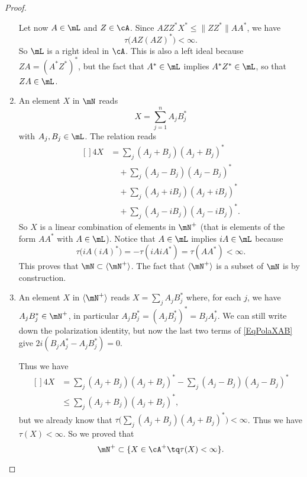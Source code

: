 \begin{proof}
\begin{enumerate}
            Let now $A\in\mL$ and $Z\in\cA$. Since $AZZ^*X^*\leq\| ZZ^* \|AA^*$, we have
            \begin{equation}
                \tau\big( AZ(AZ)^* \big)<\infty.
            \end{equation}
            So $\mL$ is a right ideal in $\cA$. This is also a left ideal because $ZA=(A^*Z^*)^*$, but the fact that $A^*\in\mL$ implies $A^*Z^*\in\mL$, so that $ZA\in\mL$.
        \item
            An element $X$ in $\mN$ reads
            \begin{equation}
                X=\sum_{j=1}^{n}A_jB_j^*
            \end{equation}
            with $A_j,B_j\in\mL$. The  relation reads
            \begin{equation}        \label{EqPolaXAB}
                \begin{aligned}[]
                    4X&=\sum_j(A_j+B_j)(A_j+B_j)^*\\
                    &\quad+\sum_j(A_j-B_j)(A_j-B_j)^*\\
                    &\quad+\sum_j(A_j+iB_j)(A_j+iB_j)^*\\
                    &\quad+\sum_j(A_j-iB_j)(A_j-iB_j)^*.
                \end{aligned}
            \end{equation}
            So $X$ is a linear combination of elements in $\mN^+$ (that is elements of the form $AA^*$ with $A\in\mL$). Notice that $A\in\mL$ implies $iA\in\mL$ because
            \begin{equation}
                \tau\big( iA(iA)^* \big)=-\tau(iAiA^*)=\tau(AA^*)<\infty.
            \end{equation}
            This proves that $\mN\subset\langle \mN^+\rangle$. The fact that $\langle \mN^+\rangle$ is a subset of $\mN$ is by construction.
        \item
            An element $X$ in $\langle \mN^+\rangle$  reads $X=\sum_jA_jB^*_j$ where, for each $j$, we have $A_jB_j^*\in\mN^+$, in particular $A_jB^*_j=(A_jB^*_j)^*=B_jA_j^*$. We can still write down the polarization identity, but now the last two terms of \eqref{EqPolaXAB} give $2i(B_jA_j^*-A_jB_j^*)=0$.

            Thus we have
            \begin{equation}
                \begin{aligned}[]
                    4X&=\sum_j(A_j+B_j)(A_j+B_j)^*-\sum_j(A_j-B_j)(A_j-B_j)^*\\
                    &\leq\sum_j(A_j+B_j)(A_j+B_j)^*,
                \end{aligned}
            \end{equation}
            but we already know that $\tau\big( \sum_j(A_j+B_j)(A_j+B_j)^* \big)<\infty$. Thus we have $\tau(X)<\infty$. So we proved that
            \begin{equation}
                \mN^+\subset\{ X\in\cA^+\tq\tau(X)<\infty \}.
            \end{equation}


\end{enumerate}
\end{proof}
